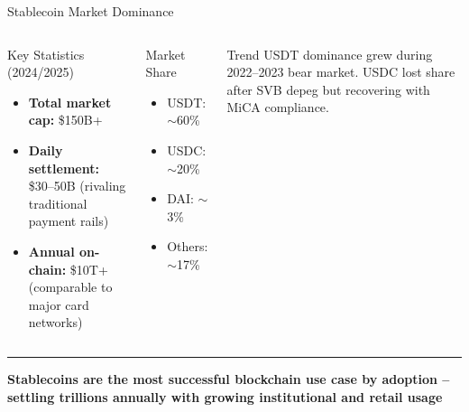 \documentclass[8pt,aspectratio=169]{beamer}
\newcommand{\bottomnote}[1]{\vfill\vspace{-2mm}\textcolor{mllavender2}{\rule{\textwidth}{0.4pt}}\vspace{1mm}\footnotesize\textbf{#1}}
\begin{document}
\begin{frame}{Stablecoin Market Dominance}
\begin{columns}[T]
\vspace{2mm}
\begin{block}{Key Statistics (2024/2025)}
\footnotesize
\begin{itemize}
  \item \textbf{Total market cap:} \$150B+
  \item \textbf{Daily settlement:} \$30--50B (rivaling traditional payment rails)
  \item \textbf{Annual on-chain:} \$10T+ (comparable to major card networks)
\end{itemize}
\end{block}
\vspace{2mm}
\begin{block}{Market Share}
\footnotesize
\begin{itemize}
  \item USDT: $\sim$60\%
  \item USDC: $\sim$20\%
  \item DAI: $\sim$3\%
  \item Others: $\sim$17\%
\end{itemize}
\end{block}
\vspace{2mm}
\begin{block}{Trend}
\footnotesize
USDT dominance grew during 2022--2023 bear market. USDC lost share after SVB depeg but recovering with MiCA compliance.
\end{block}
\end{columns}
\bottomnote{Stablecoins are the most successful blockchain use case by adoption -- settling trillions annually with growing institutional and retail usage}
\end{frame}
\end{document}

